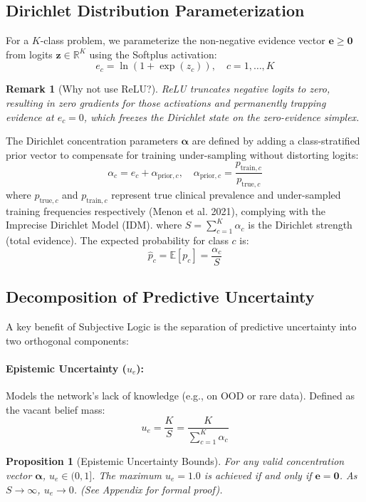 \documentclass[letterpaper]{article} %
\newcommand{\R}{\mathbb{R}}
\newcommand{\E}{\mathbb{E}}
\newtheorem{remark}{Remark}
\newtheorem{proposition}{Proposition}
\begin{document}
\subsection{Dirichlet Distribution Parameterization}
For a $K$-class problem, we parameterize the non-negative evidence vector $\bm{e} \ge \bm{0}$ from logits $\bm{z} \in \R^K$ using the Softplus activation:
\begin{equation}\label{eq:softplus}
    e_c = \ln(1 + \exp(z_c)), \quad c = 1, \ldots, K
\end{equation}
\begin{remark}[Why not use ReLU?]
ReLU truncates negative logits to zero, resulting in zero gradients for those activations and permanently trapping evidence at $e_c = 0$, which freezes the Dirichlet state on the zero-evidence simplex.
\end{remark}
The Dirichlet concentration parameters $\bm{\alpha}$ are defined by adding a class-stratified prior vector to compensate for training under-sampling without distorting logits:
\begin{equation}\label{eq:alpha}
    \alpha_c = e_c + \alpha_{\text{prior},c}, \quad \alpha_{\text{prior},c} = \frac{p_{\text{train},c}}{p_{\text{true},c}}
\end{equation}
where $p_{\text{true},c}$ and $p_{\text{train},c}$ represent true clinical prevalence and under-sampled training frequencies respectively (Menon et al. 2021), complying with the Imprecise Dirichlet Model (IDM).
where $S = \sum_{c=1}^K \alpha_c$ is the Dirichlet strength (total evidence). The expected probability for class $c$ is:
\begin{equation}\label{eq:p_hat}
    \hat{p}_c = \E[p_c] = \frac{\alpha_c}{S}
\end{equation}

\subsection{Decomposition of Predictive Uncertainty}\label{subsec:uncertainties}
A key benefit of Subjective Logic is the separation of predictive uncertainty into two orthogonal components:

\paragraph{Epistemic Uncertainty ($u_e$):} Models the network's lack of knowledge (e.g., on OOD or rare data). Defined as the vacant belief mass:
\begin{equation}\label{eq:u_e}
    u_e = \frac{K}{S} = \frac{K}{\sum_{c=1}^K \alpha_c}
\end{equation}
\begin{proposition}[Epistemic Uncertainty Bounds]
For any valid concentration vector $\bm{\alpha}$, $u_e \in (0, 1]$. The maximum $u_e = 1.0$ is achieved if and only if $\bm{e} = \bm{0}$. As $S \to \infty$, $u_e \to 0$. (See Appendix for formal proof).
\end{proposition}
\end{document}
